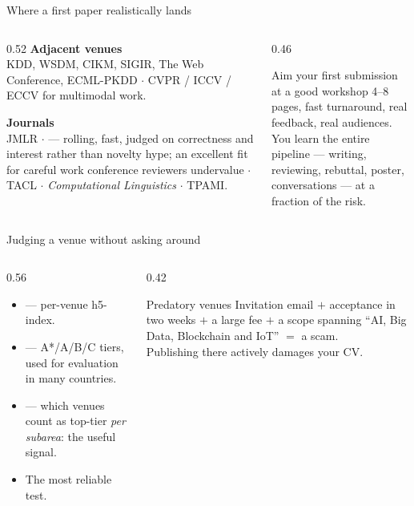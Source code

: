 \documentclass[aspectratio=169,11pt]{beamer}
\begin{document}
\begin{frame}{Where a first paper realistically lands}
\begin{columns}[T]
\begin{column}{0.52\textwidth}
\textbf{Adjacent venues}\\
\footnotesize KDD, WSDM, CIKM, SIGIR, The Web Conference, ECML-PKDD $\cdot$
CVPR / ICCV / ECCV for multimodal work.
\medskip

\normalsize\textbf{Journals}\\
\footnotesize JMLR $\cdot$  --- rolling, fast, judged on correctness
and interest rather than novelty hype; an excellent fit for careful work
conference reviewers undervalue $\cdot$ TACL $\cdot$ \emph{Computational
Linguistics} $\cdot$ TPAMI.
\end{column}
\begin{column}{0.46\textwidth}
\begin{block}{Aim your first submission at a good workshop}
\footnotesize
4--8 pages, fast turnaround, real feedback, real audiences.\\[4pt]
You learn the entire pipeline --- writing, reviewing, rebuttal, poster,
conversations --- at a fraction of the risk.
\end{block}
\end{column}
\end{columns}
\end{frame}

\begin{frame}{Judging a venue without asking around}
\begin{columns}[T]
\begin{column}{0.56\textwidth}
\begin{itemize}
  \item {} --- per-venue h5-index.
  \item {} --- A*/A/B/C tiers, used for evaluation in many
        countries.
  \item {} --- which venues count as top-tier \emph{per subarea}:
        the useful signal.
  \item {} The most reliable test.
\end{itemize}
\end{column}
\begin{column}{0.42\textwidth}
\begin{alertblock}{Predatory venues}
\footnotesize
Invitation email $+$ acceptance in two weeks $+$ a large fee $+$ a scope
spanning ``AI, Big Data, Blockchain and IoT'' $=$ a scam.\\[4pt]
Publishing there actively damages your CV.
\end{alertblock}
\end{column}
\end{columns}
\end{frame}
\end{document}
